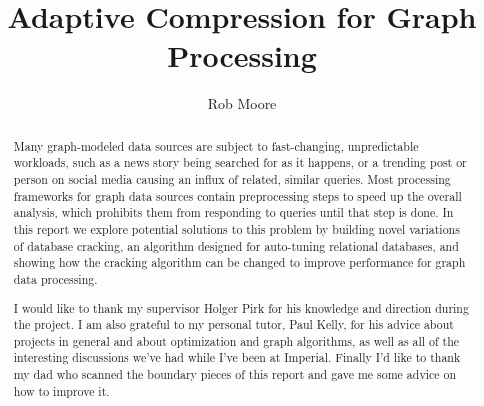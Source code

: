 \documentclass[a4paper, twoside]{report}
\title{Adaptive Compression for Graph Processing}
\author{Rob Moore}
\begin{document}


\onehalfspacing
\linespread{1.15}

\begin{abstract}
Many graph-modeled data sources are subject to fast-changing, unpredictable workloads, such as a news story being searched for as it happens, or a trending post or person on social media causing an influx of related, similar queries. Most processing frameworks for graph data sources contain preprocessing steps to speed up the overall analysis, which prohibits them from responding to queries until that step is done. In this report we explore potential solutions to this problem by building novel variations of database cracking, an algorithm designed for auto-tuning relational databases, and showing how the cracking algorithm can be changed to improve performance for graph data processing.
\end{abstract}

\renewcommand{\abstractname}{Acknowledgements}
\begin{abstract}
I would like to thank my supervisor Holger Pirk for his knowledge and direction during the project. I am also grateful to my personal tutor, Paul Kelly, for his advice about projects in general and about optimization and graph algorithms, as well as all of the interesting discussions we've had while I've been at Imperial. Finally I'd like to thank my dad who scanned the boundary pieces of this report and gave me some advice on how to improve it.
\end{abstract}

\tableofcontents
\listoffigures
\listoftables









\renewcommand\bibname{References}


\end{document}
